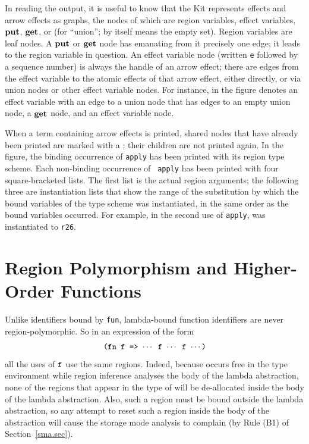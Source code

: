 \documentclass[12pt]{book}
\begin{document}
In reading the output, it is useful to know
that the Kit represents effects and arrow effects as graphs, the nodes
of which are region variables, effect variables, $\mathop{\bf put}\nolimits$, $\mathop{\bf get}\nolimits$, or
 (for ``union'';  by itself means the empty set).
Region variables are leaf nodes. A $\mathop{\bf put}\nolimits$ or $\mathop{\bf get}\nolimits$ node has emanating
from it precisely one edge; it leads to the region variable in
question.  An effect variable node (written {\tt e} followed by a
sequence number) is always the handle of an arrow effect; there are
edges from the effect variable to the atomic effects of that arrow
effect, either directly, or via union nodes or other effect variable
nodes.  For instance,  in the figure
denotes an effect variable with an edge to a union node that has edges
to an empty union node, a $\mathop{\bf get}\nolimits$ node, and an effect variable node.

When a term containing arrow effects is printed, shared nodes that
have already been printed are marked with a ; their children
are not printed again. 
In the figure, the binding occurrence of {\tt apply} has been printed
with its region type scheme. Each non-binding occurrence of {\tt
  apply} has been printed with four square-bracketed lists. The first
list is the actual region arguments; the following three are
instantiation lists that show the range of the substitution by
which the bound variables of the type scheme was instantiated, in the
same order as the bound variables occurred.  For example, in the
second use of {\tt apply},  was instantiated to {\tt r26}.

\section{Region Polymorphism and Higher-Order Functions}
Unlike identifiers bound by {\tt fun}, lambda-bound function
identifiers are never region-polymorphic. So in an expression of the
form
$$\hbox{\tt (fn f => $\cdots$ f $\cdots$ f $\cdots$)}$$
all the uses of $\hbox{\tt f}$ use the same regions. Indeed, because  occurs
free in the type environment while region inference analyses the body
of the lambda abstraction, none of the regions that appear in the type
of  will be de-allocated inside the body of the lambda
abstraction. Also, such a region must be bound outside the lambda
abstraction, so any attempt to reset such a region inside the body of
the abstraction will cause the storage mode analysis to complain (by
Rule (B1) of Section~\ref{sma.sec}).
\end{document}

